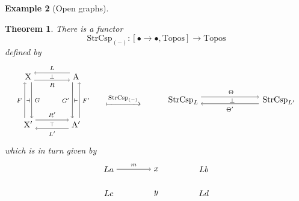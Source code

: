 \documentclass{amsart}
\newcommand{\A}{\cat{A}}
\newcommand{\X}{\cat{X}}
\newcommand{\Topos}{\cat{Topos}}
\newcommand{\StrCsp}{\cat{StrCsp}}
\newcommand{\cat}[1]{\mathrm{#1}}
\newcommand{\from}{\colon}
\newtheorem{theorem}{Theorem}[section]
\theoremstyle{remark}
\theoremstyle{definition}
\newtheorem{example}[theorem]{Example}
\begin{document}
\begin{example}[Open graphs]
\begin{theorem}
  There is a functor
  \[
    \StrCsp_{(-)} \from
    [ \bullet \to \bullet , \Topos ]
    \to
    \Topos
  \]
  defined by  
  \[
    \begin{tikzpicture}
      \begin{scope}
      \node (1) at (-1,1) {\( \X \)};
      \node (2) at (-1,-1) {\( \X' \)};
      \node (3) at (1,1) {\( \A \)};
      \node (4) at (1,-1) {\( \A' \)};
      \draw [->] (1.-60) to node [right] {\scriptsize{\( G \)}} (2.60);
      \draw [<-] (1.-120) to node [left] {\scriptsize{\( F \)}} (2.120);
      \draw [<-] (1.30) to node [above] {\scriptsize{\( L \)}} (3.150);  
      \draw [->] (1.-30) to node [below] {\scriptsize{\( R \)}} (3.-150);
      \draw [->] (2.30) to node [above] {\scriptsize{\( R' \)}} (4.150);
      \draw [<-] (2.-30) to node [below] {\scriptsize{\( L' \)}} (4.-150);      
      \draw [<-] (3.-60) to node [right] {\scriptsize{\( F' \)}} (4.60);
      \draw [->] (3.-120) to node [left] {\scriptsize{\( G' \)}}
      (4.120);
      \node (5) at (0,-1) {\scriptsize{\( \top \)}};
      \node (6) at (0,1) {\scriptsize{\( \perp \)}};
      \node (7) at (-1,0) {\scriptsize{\( \dashv \)}};
      \node (8) at (1,0) {\scriptsize{\( \vdash \)}};
      \end{scope}
      \begin{scope}[shift={(3,0)}]
      \node (1) at (0,0) { $\xmapsto{ \StrCsp_{(-)} }$ };
      \end{scope}
      \begin{scope}[shift={(5.5,0)}]
      \node (1) [inner sep=0.1cm] at (0,0) {\( \StrCsp_{L} \)};
      \node (2) [inner sep=0.15cm] at (4,0) {\( \StrCsp_{L'} \)};
      \node (3) at (2,0) {\scriptsize{ \( \perp \) }};
      \draw [->]
        ([yshift= 4pt]1.east) to
        node [above] {\scriptsize{ \( \Theta \) }}
        ([yshift= 4pt]2.west);
      \draw [->]
        ([yshift= -4pt]2.west) to
        node [below] {\scriptsize{ \( \Theta' \) } }
        ([yshift= -4pt]1.east);  
      \end{scope}
    \end{tikzpicture}
  \]
  which is in turn given by
  \[
    \begin{tikzpicture}
      \begin{scope}
      \node (1) at (-2,1) {\( La \)};
      \node (2) at (0,1) {\( x \)};
      \node (3) at (2,1) {\( Lb \)};
      \node (4) at (-2,0) {\( Lc \)};
      \node (5) at (0,0) {\( y \)};
      \node (6) at (2,0) {\( Ld \)};
      \draw [->] (1) to node [above] {\scriptsize{\( m \)}} (2);

\end{scope}
\end{tikzpicture}\]
\end{theorem}
\end{example}
\end{document}
